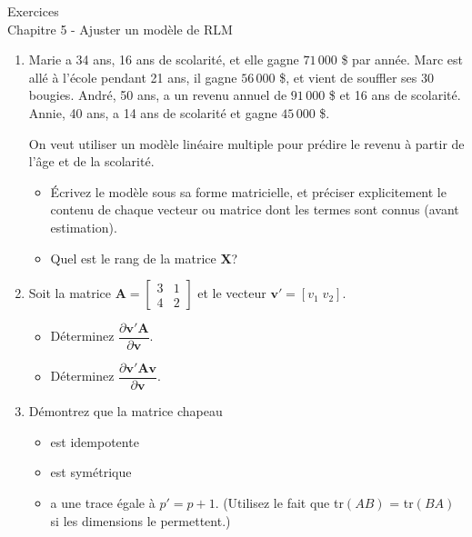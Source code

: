 \documentclass[letter, 11pt]{article}
\begin{document}
\vspace*{0.05 in}
\begin{center}
{\Large Exercices \\
Chapitre 5 - Ajuster un modèle de RLM}
\end{center}
\vspace*{0.1 in}

\begin{enumerate}\itemsep1cm


\item Marie a 34 ans,  16 ans de scolarité, et elle gagne $71\,000$ \$ par année. Marc est allé à l'école pendant 21 ans, il gagne $56\,000$ \$, et vient de souffler ses 30 bougies. André, 50 ans, a un revenu annuel de $91\,000$ \$ et 16 ans de scolarité. Annie, 40 ans, a 14 ans de scolarité et gagne $45\,000$ \$.
    
    On veut utiliser un modèle linéaire multiple pour prédire le revenu à partir de l'âge et de la scolarité. 
    
    \begin{itemize}
    \item[(a)] Écrivez le modèle sous sa forme matricielle, et préciser explicitement le contenu de chaque vecteur ou matrice dont les termes sont connus (avant estimation). 
    \item[(b)] Quel est le rang de la matrice $\bm{X}$?
    \end{itemize}

\item Soit la matrice $\bm{A}=\left[\begin{array}{cc}3&1\\4&2\end{array}\right]$ et le vecteur $\bm{v}'=[v_1\;v_2]$.

\bigskip
    \begin{itemize}\itemsep4mm
    \item[(a)] Déterminez $\dfrac{\partial \bm{v'A}}{\partial \bm{v}}$.
    \item[(b)] Déterminez $\dfrac{\partial \bm{v'Av}}{\partial \bm{v}}$.
    \end{itemize}


\item Démontrez que la matrice chapeau\\
    \begin{itemize}
    \item[(a)] est idempotente\\
    \item[(b)] est symétrique \\
    \item[(c)] a une trace égale à $p' = p+1$. (Utilisez le fait que  tr$(AB)$ = tr$(BA)$ si les dimensions le permettent.)

    \end{itemize}





\end{enumerate}
\end{document}
